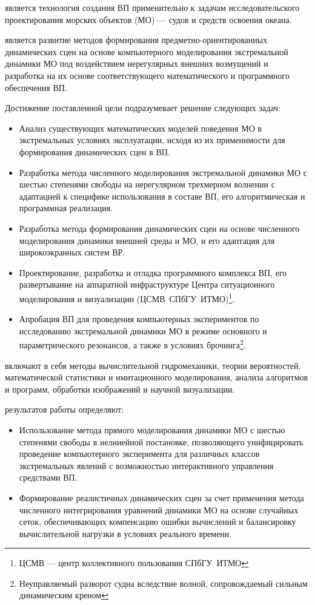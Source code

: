  является технология создания ВП применительно к задачам исследовательского проектирования морских объектов (МО) — судов и средств освоения океана.

 является развитие методов формирования предметно-ориентированных динамических сцен на основе компьютерного моделирования экстремальной динамики МО под воздействием нерегулярных внешних возмущений и разработка на их основе соответствующего математического и программного обеспечения ВП.

 Достижение поставленной цели подразумевает решение следующих задач:
\begin{itemize}
\item Анализ существующих математических моделей поведения МО в экстремальных условиях эксплуатации, исходя из их применимости для формирования динамических сцен в ВП.
\item Разработка метода численного моделирования экстремальной динамики МО с шестью степенями свободы на нерегулярном трехмерном волнении с адаптацией к специфике использования в составе ВП, его алгоритмическая и программная реализация.
\item Разработка метода формирования динамических сцен на основе численного моделирования динамики внешней среды и МО, и его адаптация для широкоэкранных систем ВР.  
\item Проектирование, разработка и отладка программного комплекса ВП, его развертывание на аппаратной инфраструктуре Центра ситуационного моделирования и визуализации (\mbox{ЦСМВ~СПбГУ~ИТМО})\footnote{ЦСМВ --- центр коллективного пользования СПбГУ~ИТМО}.
\item Апробация ВП для проведения компьютерных экспериментов по исследованию экстремальной динамики МО в режиме основного и параметрического резонансов, а также в условиях брочинга\footnote{Неуправляемый разворот судна вследствие  волной, сопровождаемый сильным динамическим креном}. 
\end{itemize}

 включают в себя методы вычислительной гидромеханики, теории вероятностей, математической статистики и имитационного моделирования, анализа алгоритмов и программ, обработки изображений и научной визуализации.


 результатов работы определяют:
\begin{itemize}
	\item	Использование метода прямого моделирования динамики МО с шестью степенями свободы в нелинейной постановке, позволяющего унифицировать проведение компьютерного эксперимента для различных классов экстремальных явлений с возможностью интерактивного управления средствами ВП.
	\item	Формирование реалистичных динамических сцен за счет применения метода численного интегрирования уравнений динамики МО на основе случайных сеток, обеспечивающих компенсацию ошибки вычислений и балансировку вычислительной нагрузки в условиях реального времени.
\end{itemize}


